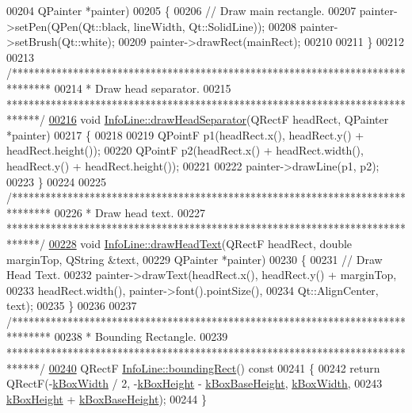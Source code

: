 \begin{DoxyCode}
00204                                  QPainter *painter)
00205 \{
00206   \textcolor{comment}{// Draw main rectangle.}
00207   painter->setPen(QPen(Qt::black, lineWidth, Qt::SolidLine));
00208   painter->setBrush(Qt::white);
00209   painter->drawRect(mainRect);
00210 
00211 \}
00212 
00213 \textcolor{comment}{/*******************************************************************************}
00214 \textcolor{comment}{ * Draw head separator.}
00215 \textcolor{comment}{ ******************************************************************************/}
\hypertarget{infoline_8cpp_source_l00216}{}\hyperlink{class_info_line_a53e9012a9cef4f07f1d4872c6d250c08}{00216} \textcolor{keywordtype}{void} \hyperlink{class_info_line_a53e9012a9cef4f07f1d4872c6d250c08}{InfoLine::drawHeadSeparator}(QRectF headRect, QPainter *painter)
00217 \{
00218 
00219   QPointF p1(headRect.x(), headRect.y() + headRect.height());
00220   QPointF p2(headRect.x() + headRect.width(), headRect.y() + headRect.height());
00221 
00222   painter->drawLine(p1, p2);
00223 \}
00224 
00225 \textcolor{comment}{/*******************************************************************************}
00226 \textcolor{comment}{ * Draw head text.}
00227 \textcolor{comment}{ ******************************************************************************/}
\hypertarget{infoline_8cpp_source_l00228}{}\hyperlink{class_info_line_a043932fa92604badc063e09691195609}{00228} \textcolor{keywordtype}{void} \hyperlink{class_info_line_a043932fa92604badc063e09691195609}{InfoLine::drawHeadText}(QRectF headRect, \textcolor{keywordtype}{double} marginTop, QString &text,
00229                             QPainter *painter)
00230 \{
00231   \textcolor{comment}{// Draw Head Text.}
00232   painter->drawText(headRect.x(), headRect.y() + marginTop,
00233                     headRect.width(), painter->font().pointSize(),
00234                     Qt::AlignCenter, text);
00235 \}
00236 
00237 \textcolor{comment}{/*******************************************************************************}
00238 \textcolor{comment}{ * Bounding Rectangle.}
00239 \textcolor{comment}{ ******************************************************************************/}
\hypertarget{infoline_8cpp_source_l00240}{}\hyperlink{class_info_line_a3103eee5d5a8b4fd53d428f9aea01830}{00240} QRectF \hyperlink{class_info_line_a3103eee5d5a8b4fd53d428f9aea01830}{InfoLine::boundingRect}()\textcolor{keyword}{ const}
00241 \textcolor{keyword}{}\{
00242   \textcolor{keywordflow}{return} QRectF(-\hyperlink{class_info_line_a33821aa140dc03829357d4006e9c153c}{kBoxWidth} / 2, -\hyperlink{class_info_line_a9e459549795bab79ae3b6c184dc78a00}{kBoxHeight} - \hyperlink{class_info_line_ab50f47aa54c45def219859e9da3755e6}{kBoxBaseHeight}, 
      \hyperlink{class_info_line_a33821aa140dc03829357d4006e9c153c}{kBoxWidth},
00243                 \hyperlink{class_info_line_a9e459549795bab79ae3b6c184dc78a00}{kBoxHeight} + \hyperlink{class_info_line_ab50f47aa54c45def219859e9da3755e6}{kBoxBaseHeight});
00244 \}
\end{DoxyCode}
